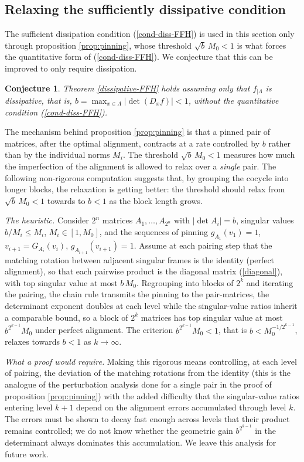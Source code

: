 \documentclass[a4paper,11pt]{article}
\newtheorem{conjecture}[lemma]{Conjecture}
\theoremstyle{definition}
\def\La{\Lambda}
\def\La{\Lambda}
\begin{document}
\subsection{Relaxing the  sufficiently dissipative condition}\label{subsec:relaxing}


The sufficient dissipation condition (\ref{cond-diss-FFH}) is used in this
section only through proposition \ref{prop:pinning}, whose threshold
$\sqrt b\,M_0<1$ is what forces the quantitative form of (\ref{cond-diss-FFH}).
We conjecture that this can be improved to only require dissipation.

\begin{conjecture}\label{conj:relaxing}
Theorem \ref{dissipative-FFH} holds assuming only that $f_{|\La}$ is
dissipative, that is, $b=\max_{x\in\La}|\det(D_xf)|<1$, without the
quantitative condition (\ref{cond-diss-FFH}).
\end{conjecture}



The mechanism behind proposition \ref{prop:pinning} is that a pinned pair of
matrices, after the optimal alignment, contracts at a rate controlled by $b$
rather than by the individual norms $M_i$. The threshold $\sqrt b\,M_0<1$
measures how much the imperfection of the alignment is allowed to relax over a
\emph{single} pair. The following non-rigorous computation suggests that, by
grouping the cocycle into longer blocks, the relaxation is getting better: the
 threshold should relax from $\sqrt b\,M_0<1$ towards to  $b<1$ as the block length grows.


\emph{The heuristic.} Consider $2^n$ matrices $A_1,\dots,A_{2^n}$ with
$|\det A_i|=b$, singular values $b/M_i\le M_i$, $M_i\in[1,M_0]$, and the
sequences of  pinning $g_{A_1}(v_1)=1$, $v_{i+1}=G_{A_i}(v_i)$,
$g_{A_{i+1}}(v_{i+1})=1$. Assume at each pairing step that the matching
rotation between adjacent singular frames is the identity (perfect
alignment), so that each pairwise product is the diagonal matrix
(\ref{diagonal}), with top singular value at most $b\,M_0$. Regrouping into
blocks of $2^k$ and iterating the pairing, the chain rule transmits the
pinning to the pair-matrices, the determinant exponent doubles at each
level while the singular-value ratios inherit a comparable bound, so a block
of $2^k$ matrices has top singular value at most $b^{2^{k-1}}M_0$ under
perfect alignment. The criterion $b^{2^{k-1}}M_0<1$, that is
$b<M_0^{-1/2^{k-1}}$, relaxes towards $b<1$ as $k\to\infty$.

\emph{What a proof would require.} Making this rigorous means controlling, at
each level of pairing, the deviation of the matching rotations from the
identity (this is the analogue of the perturbation analysis done  for a
single pair in the proof of proposition \ref{prop:pinning}) with the added
difficulty that the singular-value ratios entering level $k+1$ depend on the
alignment errors accumulated through level $k$. The errors must be shown to
decay fast enough across levels that their product remains controlled; we do
not know whether the geometric gain $b^{2^{k-1}}$ in the determinant always
dominates this accumulation. We leave this analysis for future work.
\end{document}
